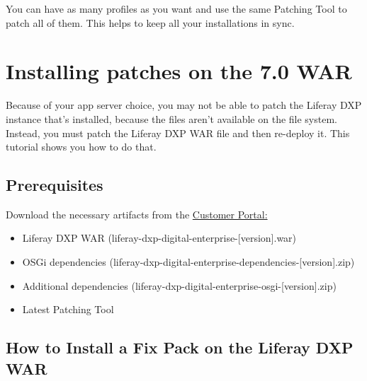 You can have as many profiles as you want and use the same Patching Tool
to patch all of them. This helps to keep all your installations in sync.

\section{Installing patches on the 7.0
WAR}\label{installing-patches-on-the-7.0-war}

Because of your app server choice, you may not be able to patch the
Liferay DXP instance that's installed, because the files aren't
available on the file system. Instead, you must patch the Liferay DXP
WAR file and then re-deploy it. This tutorial shows you how to do that.

\subsection{Prerequisites}\label{prerequisites}

Download the necessary artifacts from the
\href{https://web.liferay.com/group/customer/dxp/downloads/digital-enterprise}{Customer
Portal:}

\begin{itemize}
\tightlist
\item
  Liferay DXP WAR (liferay-dxp-digital-enterprise-{[}version{]}.war)
\item
  OSGi dependencies
  (liferay-dxp-digital-enterprise-dependencies-{[}version{]}.zip)
\item
  Additional dependencies
  (liferay-dxp-digital-enterprise-osgi-{[}version{]}.zip)
\item
  Latest Patching Tool
\end{itemize}

\subsection{How to Install a Fix Pack on the Liferay DXP
WAR}\label{how-to-install-a-fix-pack-on-the-liferay-dxp-war}

